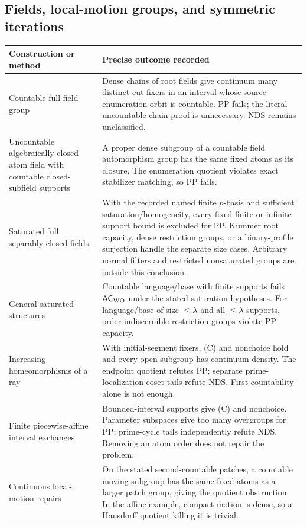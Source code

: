 \subsection{Fields, local-motion groups, and symmetric iterations}
\begin{longtable}{>{\raggedright\arraybackslash}p{.26\linewidth}>{\raggedright\arraybackslash}p{.66\linewidth}}
\toprule
Construction or method & Precise outcome recorded\\\midrule\endhead
Countable full-field group & Dense chains of root fields give continuum many distinct cut fixers in an interval whose source enumeration orbit is countable. PP fails; the literal uncountable-chain proof is unnecessary. NDS remains unclassified.\\
Uncountable algebraically closed atom field with countable closed-subfield supports & A proper dense subgroup of a countable field automorphism group has the same fixed atoms as its closure. The enumeration quotient violates exact stabilizer matching, so PP fails.\\
Saturated full separably closed fields & With the recorded named finite $p$-basis and sufficient saturation/homogeneity, every fixed finite or infinite support bound is excluded for PP. Kummer root capacity, dense restriction groups, or a binary-profile surjection handle the separate size cases. Arbitrary normal filters and restricted nonsaturated groups are outside this conclusion.\\
General saturated structures & Countable language/base with finite supports fails $\mathsf{AC}_{\mathrm{WO}}$ under the stated saturation hypotheses. For language/base of size $\leq\lambda$ and all $\leq\lambda$ supports, order-indiscernible restriction groups violate PP capacity.\\
Increasing homeomorphisms of a ray & With initial-segment fixers, (C) and nonchoice hold and every open subgroup has continuum density. The endpoint quotient refutes PP; separate prime-localization coset tails refute NDS. First countability alone is not enough.\\
Finite piecewise-affine interval exchanges & Bounded-interval supports give (C) and nonchoice. Parameter subspaces give too many overgroups for PP; prime-cycle tails independently refute NDS. Removing an atom order does not repair the problem.\\
Continuous local-motion repairs & On the stated second-countable patches, a countable moving subgroup has the same fixed atoms as a larger patch group, giving the quotient obstruction. In the affine example, compact motion is dense, so a Hausdorff quotient killing it is trivial.\\

\end{longtable}
